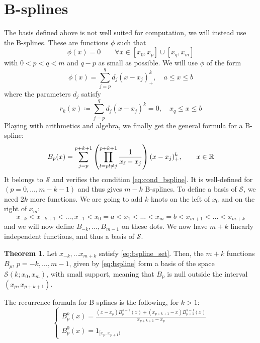 \documentclass[12pt, openany]{report}
\newcommand{\R}{\mathbb{R}}
\theoremstyle{definition}
\newtheorem{thm}{Theorem}[chapter]
\begin{document}
\section{B-splines}
The basis defined above is not well suited for computation, we will instead use the B-splines. These are functions \(\phi\) such that 
\begin{equation}\label{eq:cond_bspline}
    \phi(x) = 0\qquad \forall x\in [x_0,x_p]\cup [x_q,x_m]
\end{equation}
with \(0<p<q<m\) and \(q-p\) as small as possible. We will use \(\phi\) of the form 
\begin{equation}
    \phi(x) = \sum_{j=p}^qd_j(x-x_j)^k_+, \quad a\le x \le b
\end{equation} 
where the parameters \(d_j\) satisfy
\begin{equation}
    r_k(x)\coloneqq \sum_{j=p}^qd_j(x-x_j)^k=0,\quad x_q\le x\le b
\end{equation}
Playing with arithmetics and algebra, we finally get the general formula for a B-spline:
\begin{equation}\label{eq:bspline}
    B_p(x) = \sum_{j=p}^{p+k+1}\left(\prod_{l=p\\ l\neq j}^{p+k+1}\frac{1}{x_\ell-x_j}\right)(x-x_j)^k_+,\qquad x\in \R
\end{equation}
It belongs to \(\mathcal{S}\) and verifies the condition \eqref{eq:cond_bspline}. It is well-defined for \((p=0,\dots,m-k-1)\) and thus gives \(m-k\) B-splines. To define a basis of \(\mathcal{S}\), we need \(2k\) more functions. We are going to add \(k\) knots on the left of \(x_0\) and on the right of \(x_m\):
\begin{equation}\label{eq:bspline_set}
    x_{-k}<x_{-k+1}<\dots,x_{-1}<x_0=a<x_1<\dots<x_{m}=b<x_{m+1}<\dots<x_{m+k}
\end{equation}
and we will now define \(B_{-k},\dots,B_{m-1}\) on these dots. We now have \(m+k\) linearly independent functions, and thus a basis of \(\mathcal{S}\). 
\begin{thm}
    Let \(x_{-k},\dots x_{m+k}\) satisfy \eqref{eq:bspline_set}. Then, the \(m+k\) functions \(B_p\), \(p=-k,\dots,m-1\), given by \eqref{eq:bspline} form a basis of the space \(\mathcal{S}(k;x_0,x_m)\), with small support, meaning that \(B_p\) is null outside the interval \((x_p,x_{p+k+1})\). 
\end{thm}
The recurrence formula for B-splines is the following, for \(k>1\):
\begin{equation}
    \begin{cases}
        B_p^k(x) = \frac{(x-x_p)B_p^{k-1}(x)+(x_{p+k+1}-x)B_{p+1}^{k-1}(x)}{x_{p+k+1}-x_p}\\
        B_p^0(x) = 1_{[x_p,x_{p+1})}
    \end{cases}
\end{equation}
\end{document}
